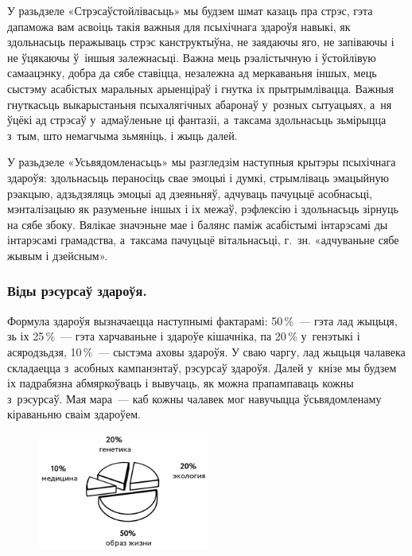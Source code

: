 
У разьдзеле «Стрэсаўстойлівасьць» мы будзем шмат казаць пра стрэс, гэта дапаможа вам асвоіць такія важныя для псыхічнага здароўя навыкі, як здольнасьць перажываць стрэс канструктыўна, не заядаючы яго, не запіваючы і не ўцякаючы ў~іншыя залежнасьці. Важна мець рэалістычную і ўстойлівую самаацэнку, добра да сябе ставіцца, незалежна ад меркаваньня іншых, мець сыстэму асабістых маральных арыенціраў і гнутка іх прытрымлівацца. Важныя гнуткасьць выкарыстаньня псыхалягічных абаронаў у~розных сытуацыях, а~ня ўцёкі ад стрэсаў у~адмаўленьне ці фантазіі, а~таксама здольнасьць зьмірыцца з~тым, што немагчыма зьмяніць, і жыць далей.

У разьдзеле «Усьвядомленасьць» мы разгледзім наступныя крытэры псыхічнага здароўя: здольнасьць пераносіць свае эмоцыі і думкі, стрымліваць эмацыйную рэакцыю, адзьдзяляць эмоцыі ад дзеяньняў, адчуваць пачуцьцё асобнасьці, мэнталізацыю як разуменьне іншых і іх межаў, рэфлексію і здольнасьць зірнуць на сябе збоку. Вялікае значэньне мае і балянс паміж асабістымі інтарэсамі ды інтарэсамі грамадства, а~таксама пачуцьцё вітальнасьці, г.~зн. «адчуваньне сябе жывым і дзейсным».

\subsubsection{Віды рэсурсаў здароўя.}

Формула здароўя вызначаецца наступнымі фактарамі: 50\,\%~--- гэта лад жыцьця, зь іх 25\,\%~--- гэта харчаваньне і здароўе кішачніка, па 20\,\% у~генэтыкі і асяродзьдзя, 10\,\%~--- сыстэма аховы здароўя. У сваю чаргу, лад жыцьця чалавека складаецца з~асобных кампанэнтаў, рэсурсаў здароўя. Далей у~кнізе мы будзем іх падрабязна абмяркоўваць і вывучаць, як можна прапампаваць кожны з~рэсурсаў. Мая мара~--- каб кожны чалавек мог навучыцца ўсьвядомленаму кіраваньню сваім здароўем.

\begin{figure}[htb!]
  \centering
  \includegraphics[width=0.5\textwidth]{willpower/pic4.png}
\end{figure}

